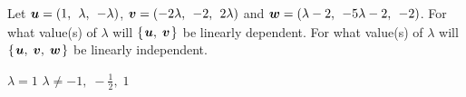 
\begin{Exercise}[
name={},
title={}, 
difficulty=0,
origin={\cite{YL}}]
Let $\vec{u}=\rowvec{1,& \lambda,& -\lambda}$, $\vec{v}=\rowvec{-2\lambda,& -2,& 2\lambda}$ and $\vec{w}=\rowvec{\lambda-2,& -5\lambda-2,& -2}$.
\Question For what value(s) of $\lambda$ will $\mbox{$\left\{\hspace{0.1em}\bm{u},\; \bm{v}\hspace{0.1em}\right\}$}$ be linearly dependent.
\Question For what value(s) of $\lambda$ will $\mbox{$\left\{\hspace{0.1em}\bm{u},\; \bm{v},\; \bm{w}\hspace{0.1em}\right\}$}$ be linearly independent.
\end{Exercise}

\begin{Answer}
\Question $\lambda=1$
\Question $\lambda\neq-1,\;-\frac12,\;1$
\end{Answer}
